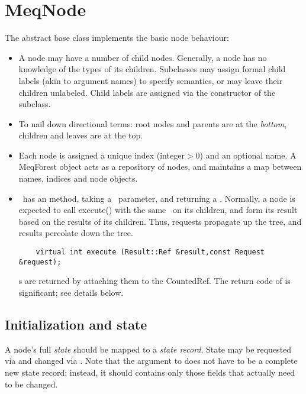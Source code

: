 \documentclass[10pt]{article}
\begin{document}
\section{MeqNode}

  The abstract base class  implements the basic node behaviour:

  \begin{itemize}

  \item A node may have a number of child nodes. Generally, a node has no
    knowledge of the types of its children. Subclasses may assign formal child
    labels (akin to argument names) to specify semantics, or may leave their
    children unlabeled. Child labels are assigned via the constructor of the
    subclass.

  \item To nail down directional terms: root nodes and parents are at the {\em
    bottom}, children and leaves are at the top. 

  \item Each node is assigned a unique index (integer$>$0) and an optional name. A
    MeqForest object acts as a repository of nodes, and maintains a map between
    names, indices and node objects.

  \item \Node\ has an  method, taking a \Request\ parameter,
    and returning a \Result. Normally, a node is expected to call execute()
    with the same \Request\ on its children, and form its result based on the
    results of its children. Thus, requests propagate up the tree, and results
    percolate down the tree.

\begin{verbatim}
    virtual int execute (Result::Ref &result,const Request &request);
\end{verbatim}

    \Result{}s are returned by attaching them to the CountedRef. The return code
    of  is significant; see details below.

  \end{itemize}

\subsection{Initialization and state}
  
  A node's full {\em state} should be mapped to a {\em state record}. State may
  be requested via  and changed via . Note that
  the argument to  does not have to be a complete new state
  record; instead, it should contains only those fields that actually need to
  be changed. 
\end{document}
